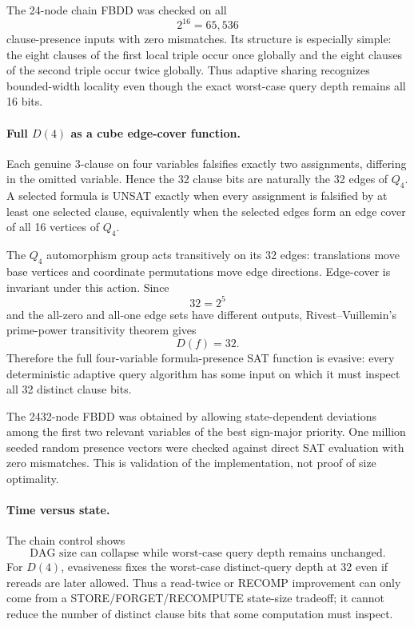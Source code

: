 The 24-node chain FBDD was checked on all
\[
2^{16}=65{,}536
\]
clause-presence inputs with zero mismatches. Its structure is especially simple: the eight clauses of the first local triple occur once globally and the eight clauses of the second triple occur twice globally. Thus adaptive sharing recognizes bounded-width locality even though the exact worst-case query depth remains all 16 bits.

\paragraph{Full $D(4)$ as a cube edge-cover function.}
Each genuine 3-clause on four variables falsifies exactly two assignments, differing in the omitted variable. Hence the 32 clause bits are naturally the 32 edges of $Q_4$. A selected formula is UNSAT exactly when every assignment is falsified by at least one selected clause, equivalently when the selected edges form an edge cover of all 16 vertices of $Q_4$.

The $Q_4$ automorphism group acts transitively on its 32 edges: translations move base vertices and coordinate permutations move edge directions. Edge-cover is invariant under this action. Since
\[
32=2^5
\]
and the all-zero and all-one edge sets have different outputs, Rivest--Vuillemin's prime-power transitivity theorem gives
\[
\boxed{D(f)=32}.
\]
Therefore the full four-variable formula-presence SAT function is evasive: every deterministic adaptive query algorithm has some input on which it must inspect all 32 distinct clause bits.

The 2432-node FBDD was obtained by allowing state-dependent deviations among the first two relevant variables of the best sign-major priority. One million seeded random presence vectors were checked against direct SAT evaluation with zero mismatches. This is validation of the implementation, not proof of size optimality.

\paragraph{Time versus state.}
The chain control shows
\[
\text{DAG size can collapse while worst-case query depth remains unchanged}.
\]
For $D(4)$, evasiveness fixes the worst-case distinct-query depth at 32 even if rereads are later allowed. Thus a read-twice or RECOMP improvement can only come from a STORE/FORGET/RECOMPUTE state-size tradeoff; it cannot reduce the number of distinct clause bits that some computation must inspect.

